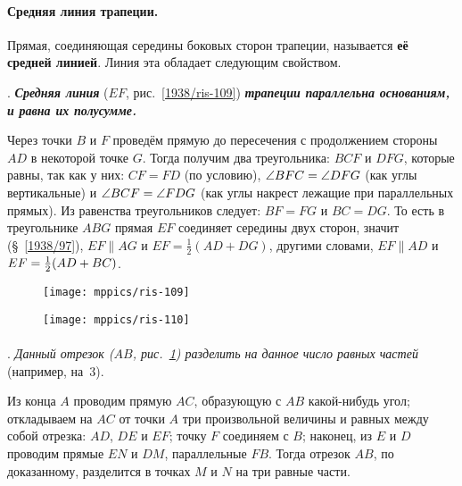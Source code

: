 \paragraph{Средняя линия трапеции.}\label{1938/99}
Прямая, соединяющая середины боковых сторон трапеции, называется \textbf{её средней линией}.
Линия эта обладает следующим свойством.

\smallskip
\mbox{.}
\textbf{\emph{Средняя линия}} ($EF$, рис.~\ref{1938/ris-109}) \textbf{\emph{трапеции параллельна основаниям, и равна их полусумме.}}

Через точки $B$ и $F$ проведём прямую до пересечения с продолжением стороны $AD$ в некоторой точке $G$.
Тогда получим два треугольника:
$BCF$ и $DFG$, которые равны, так как у них:
$CF=FD$ (по условию), $\angle BFC\z=\angle DFG$ (как углы вертикальные) и $\angle BCF \z= \angle FDG$ (как углы накрест лежащие при параллельных прямых).
Из равенства треугольников следует:
$BF=FG$ и $BC=DG$.
То есть в треугольнике $ABG$ прямая $EF$ соединяет середины двух сторон, значит (§~\ref{1938/97}), $EF \parallel AG$ и $EF = \tfrac12(AD+DG)$, другими словами, $EF\parallel AD$ и $EF \z= \tfrac12(AD + BC)$.

\begin{figure}[h]
\begin{minipage}{.54\textwidth}
\centering
\texttt{[image: mppics/ris-109]}
\end{minipage}\hfill
\begin{minipage}{.44\textwidth}
\centering
\texttt{[image: mppics/ris-110]}
\end{minipage}

\medskip

\begin{minipage}{.54\textwidth}
\centering
\caption{}\label{1938/ris-109}
\end{minipage}\hfill
\begin{minipage}{.44\textwidth}
\centering
\caption{}\label{1938/ris-110}
\end{minipage}
\vskip-4mm
\end{figure} 

\paragraph{}\label{1938/100}
\mbox{.}
\emph{Данный отрезок \emph{($AB$, рис.~\ref{1938/ris-110})} разделить на данное число равных частей} (например, на~3).

Из конца $A$ проводим прямую $AC$, образующую с $AB$ какой-нибудь угол;
откладываем на $AC$ от точки $A$ три произвольной величины и равных между собой отрезка:
$AD$, $DE$ и $EF$;
точку $F$ соединяем с $B$;
наконец, из $E$ и $D$ проводим прямые $EN$ и $DM$, параллельные $FB$.
Тогда отрезок $AB$, по доказанному, разделится в точках $M$ и $N$ на три равные части.

